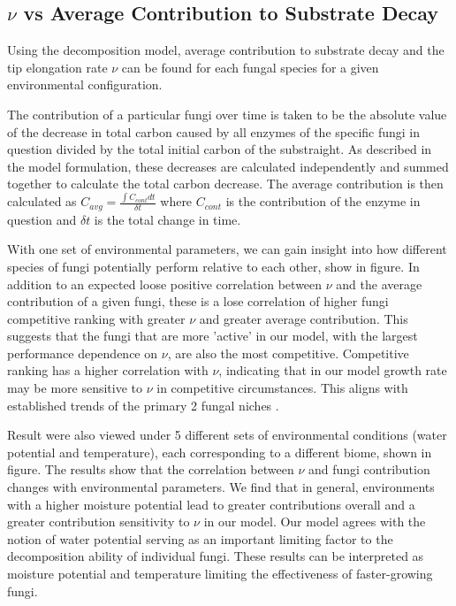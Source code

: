 \documentclass{article}
\begin{document}
 \subsection{$\nu$ vs Average Contribution to Substrate Decay} %
Using the decomposition model, average contribution to substrate decay and the tip elongation rate $\nu$ can be found for each fungal species for a given environmental configuration. 

The contribution of a particular fungi over time is taken to be the absolute value of the decrease in total carbon caused by all enzymes of the specific fungi in question divided by the total initial carbon of the substraight. As described in the model formulation, these decreases are calculated independently and summed together to calculate the total carbon decrease. The average contribution is then calculated as $C_{avg} = \frac{ \int C_{cont} dt}{\delta t}$ where $C_{cont}$ is the contribution of the enzyme in question and $\delta t$ is the total change in time.

With one set of environmental parameters, we can gain insight into how different species of fungi potentially perform relative to each other, show in figure. In addition to an expected loose positive correlation between $\nu$ and the average contribution of a given fungi, these is a lose correlation of higher fungi competitive ranking with greater $\nu$ and greater average contribution. This suggests that the fungi that are more 'active' in our model, with the largest performance dependence on $\nu$, are also the most competitive. Competitive ranking has a higher correlation with $\nu$, indicating that in our model growth rate may be more sensitive to $\nu$ in competitive circumstances. This aligns with established trends of the primary 2 fungal niches \cite{Maynard2019}.

Result were also viewed under 5 different sets of environmental conditions (water potential and temperature), each corresponding to a different biome, shown in figure. The results show that the correlation between $\nu$ and fungi contribution changes with environmental parameters. We find that in general, environments with a higher moisture potential lead to greater contributions overall and a greater contribution sensitivity to $\nu$ in our model. Our model agrees with the notion of water potential serving as an important limiting factor to the decomposition ability of individual fungi. These results can be interpreted as moisture potential and temperature limiting the effectiveness of faster-growing fungi.  
\end{document}
